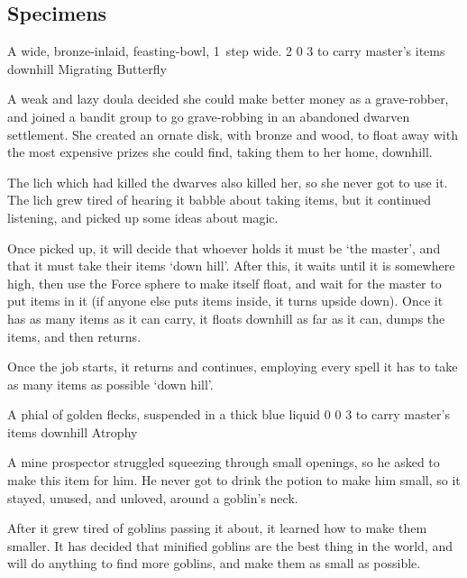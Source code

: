 \begin{multicols}{2}
\subsection{Specimens}

  {A wide, bronze-inlaid, feasting-bowl, 1~\gls{step} wide.}%
  {2}%
  {0}%
  {3}%
  {to carry master's items downhill}%
  {Migrating Butterfly}%
  {
    \setcounter{Fire}{2}
    \setcounter{Earth}{2}
    \setcounter{Water}{2}
    \setcounter{Vigilance}{2}
  }%

A weak and lazy \gls{doula} decided she could make better money as a grave-robber, and joined a bandit group to go grave-robbing in an abandoned dwarven settlement.
She created an ornate disk, with bronze and wood, to float away with the most expensive prizes she could find, taking them to her home, downhill.

The lich which had killed the dwarves also killed her, so she never got to use it.
The lich grew tired of hearing it babble about taking items, but it continued listening, and picked up some ideas about magic.

Once picked up, it will decide that whoever holds it must be `the master', and that it must take their items `down hill'.
After this, it waits until it is somewhere high, then use the Force \gls{sphere} to make itself float, and wait for the master to put items in it (if anyone else puts items inside, it turns upside down).
Once it has as many items as it can carry, it floats downhill as far as it can, dumps the items, and then returns.

Once the job starts, it returns and continues, employing every spell it has to take as many items as possible `down hill'.

\showStdSpells

  {A phial of golden flecks, suspended in a thick blue liquid}%
  {0}%
  {0}%
  {3}%
  {to carry master's items downhill}%
  {Atrophy}%
  {
    \setcounter{Earth}{2}
    \setcounter{Water}{2}
    \setcounter{Caving}{3}
  }%

A mine prospector struggled squeezing through small openings, so he asked  to make this item for him.
He never got to drink the potion to make him small, so it stayed, unused, and unloved, around a goblin's neck.

After it grew tired of goblins passing it about, it learned how to make them smaller.
It has decided that minified goblins are the best thing in the world, and will do anything to find more goblins, and make them as small as possible.


\end{multicols}
